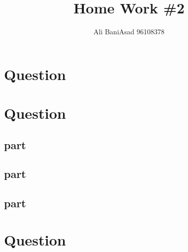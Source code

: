 \documentclass{article}
\title{Home Work \#2}
\author{Ali BaniAsad 96108378}
\begin{document}
	\maketitle

	\section{Question}
	
	\section{Question}
	\subsection{part}
	
	\subsection{part}
	
	\subsection{part}
	
	\section{Question}
	
	\newpage
	\tableofcontents
\end{document}
